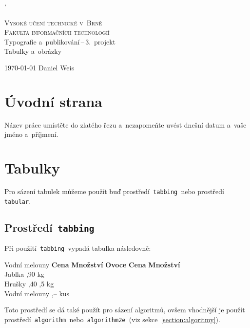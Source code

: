 \documentclass[a4paper, 11pt]{article}
\begin{document}
	
	\catcode`

	\begin{titlepage}
		\begin{center}
			\Huge
			\textsc{Vysoké učení technické v~Brně} \\
			\huge
			\textsc{Fakulta informačních technologií} \\
			\LARGE
			Typografie a~publikování\,--\,3.~projekt \\
			\Huge
			Tabulky a~obrázky
		\end{center}

		{\Large
			\today
			\hfill
			Daniel Weis
		}
	\end{titlepage}


	\section{Úvodní strana}

	Název práce umístěte do zlatého řezu a~nezapomeňte uvést dnešní datum a~vaše jméno a~příjmení.


	
	\section{Tabulky}

	Pro sázení tabulek můžeme použít buď prostředí\texttt{ tabbing }nebo prostředí\texttt{ tabular}.


	
	\subsection{Prostředí\texttt{ tabbing}}

	Při použití\texttt{ tabbing }vypadá tabulka následovně:
	\begin{tabbing}
		Vodní melouny \quad	\= \textbf{Cena} \quad	\= \textbf{Množství}	\kill
		\textbf{Ovoce}		\> \textbf{Cena}		\> \textbf{Množství}	\\
		Jablka				,90				 kg					\\
		Hrušky				,40				,5 kg				\\
		Vodní melouny		,--				 kus				\\
	\end{tabbing}
	Toto prostředí se dá také použít pro sázení algoritmů, ovšem vhodnější je použít
	prostředí\texttt{ algorithm }nebo\texttt{ algorithm2e }(viz sekce~\ref{section:algoritmy}).
\end{document}
